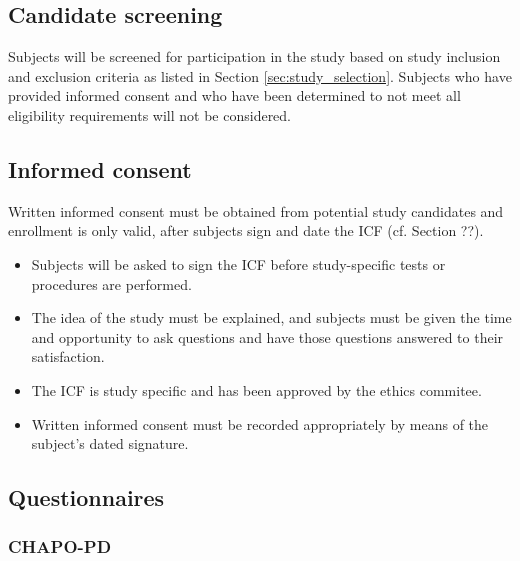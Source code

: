 
\subsection{Candidate screening}
\label{subsec:screening}
Subjects will be screened for participation in the study based on study inclusion and exclusion criteria as listed in Section \ref{sec:study_selection}. Subjects who have provided informed consent and who have been determined to not meet all eligibility requirements will not be considered.

\subsection{Informed consent}
Written informed consent must be obtained from potential study candidates and enrollment is only valid, after subjects sign and date the \ac{ICF} (cf. Section ??).
\begin{itemize}
\item Subjects will be asked to sign the \ac{ICF} before study-specific tests or procedures are performed.
\item The idea of the study must be explained, and subjects must be given the time and opportunity to ask questions and have those questions answered to their satisfaction.
\item The \ac{ICF} is study specific and has been approved by the ethics commitee.
\item Written informed consent must be recorded appropriately by means of the subject’s dated signature.
\end{itemize}

\subsection{Questionnaires}
\label{subsec:questionnaires}
\subsubsection{\acl{CHAPO-PD}}

